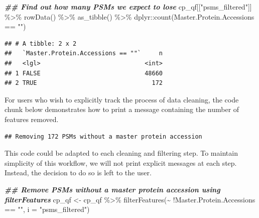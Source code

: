 \documentclass[9pt,a4paper,]{extarticle}
\newenvironment{Shaded}{\begin{snugshade}}{\end{snugshade}}
\newcommand{\AttributeTok}[1]{\textcolor[rgb]{0.77,0.63,0.00}{#1}}
\newcommand{\DocumentationTok}[1]{\textcolor[rgb]{0.56,0.35,0.01}{\textbf{\textit{#1}}}}
\newcommand{\FunctionTok}[1]{\textcolor[rgb]{0.00,0.00,0.00}{#1}}
\newcommand{\NormalTok}[1]{#1}
\newcommand{\OtherTok}[1]{\textcolor[rgb]{0.56,0.35,0.01}{#1}}
\newcommand{\SpecialCharTok}[1]{\textcolor[rgb]{0.00,0.00,0.00}{#1}}
\newcommand{\StringTok}[1]{\textcolor[rgb]{0.31,0.60,0.02}{#1}}
\begin{document}
\begin{Shaded}
\begin{Highlighting}[]
\DocumentationTok{\#\# Find out how many PSMs we expect to lose}
\NormalTok{cp\_qf[[}\StringTok{"psms\_filtered"}\NormalTok{]] }\SpecialCharTok{\%\textgreater{}\%} 
  \FunctionTok{rowData}\NormalTok{() }\SpecialCharTok{\%\textgreater{}\%} 
  \FunctionTok{as\_tibble}\NormalTok{() }\SpecialCharTok{\%\textgreater{}\%} 
\NormalTok{  dplyr}\SpecialCharTok{::}\FunctionTok{count}\NormalTok{(Master.Protein.Accessions }\SpecialCharTok{==} \StringTok{""}\NormalTok{)}
\end{Highlighting}
\end{Shaded}

\begin{verbatim}
## # A tibble: 2 x 2
##   `Master.Protein.Accessions == ""`     n
##   <lgl>                             <int>
## 1 FALSE                             48660
## 2 TRUE                                172
\end{verbatim}

For users who wish to explicitly track the process of data cleaning, the code
chunk below demonstrates how to print a message containing the number of features
removed.

\begin{Shaded}
\end{Shaded}

\begin{verbatim}
## Removing 172 PSMs without a master protein accession
\end{verbatim}

This code could be adapted to each cleaning and filtering step. To maintain
simplicity of this workflow, we will not print explicit messages at each step.
Instead, the decision to do so is left to the user.

\begin{Shaded}
\begin{Highlighting}[]
\DocumentationTok{\#\# Remove PSMs without a master protein accession using filterFeatures}
\NormalTok{cp\_qf }\OtherTok{\textless{}{-}}\NormalTok{ cp\_qf }\SpecialCharTok{\%\textgreater{}\%}
  \FunctionTok{filterFeatures}\NormalTok{(}\SpecialCharTok{\textasciitilde{}} \SpecialCharTok{!}\NormalTok{Master.Protein.Accessions }\SpecialCharTok{==} \StringTok{""}\NormalTok{,}
                 \AttributeTok{i =} \StringTok{"psms\_filtered"}\NormalTok{)}
\end{Highlighting}
\end{Shaded}
\end{document}
